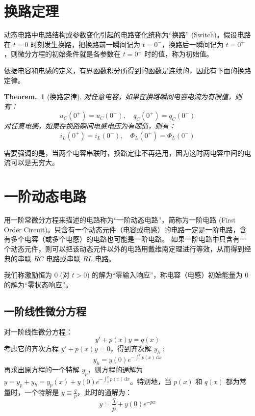 \documentclass[UTF8]{report}
\theoremstyle{MyLineTheoremStyle} %
\theoremstyle{MyBlockTheoremStyle} %
\newtheorem{BlockTheorem}[LineTheorem]{Theorem.\,} %
\theoremstyle{MySubsubsectionStyle} %
\begin{document}
\section{换路定理}
动态电路中电路结构或参数变化引起的电路变化统称为“换路” (Switch)。假设电路在 $t = 0$ 时刻发生换路，把换路前一瞬间记为 $t = 0^-$，换路后一瞬间记为 $t = 0^+$，则微分方程的初始条件就是各参数在 $t = 0^+$ 时的值，称为初始值。

依据电容和电感的定义，有界函数积分所得到的函数是连续的，因此有下面的换路定律。
\begin{BlockTheorem}[换路定律]\label{换路定律}
对任意电容，如果在换路瞬间电容电流为有限值，则有：
\begin{equation}
u_{C}(0^+) = u_{C}(0^-),\quad q_{C}(0^+) = q_{C}(0^-)
\end{equation}
对任意电感，如果在换路瞬间电感电压为有限值，则有：
\begin{equation}
i_{L}(0^+) = i_{L}(0^-),\quad \Phi_{L}(0^+) = \Phi_{L}(0^-)
\end{equation}
\end{BlockTheorem}

需要强调的是，当两个电容串联时，换路定律不再适用，因为这时两电容中间的电流可以是无穷大。

\section{一阶动态电路}

用一阶常微分方程来描述的电路称为“一阶动态电路”，简称为一阶电路 (First Order Circuit)。只含有一个动态元件（电容或电感）的电路一定是一阶电路，含有多个电容（或多个电感）的电路也可能是一阶电路。
如果一阶电路中只含有一个动态元件，则可以把该动态元件以外的电路用戴维南定理进行等效，从而得到经典的串联 $RC$ 电路或串联 $RL$ 电路。

我们称激励恒为 0 (对 $t>0$) 的解为“零输入响应”，称电容（电感）初始能量为 0 的解为“零状态响应”。


\subsection{一阶线性微分方程}

对一阶线性微分方程：
\begin{equation}
y' + p(x)y = q(x)
\end{equation}
考虑它的齐次方程 $y' + p(x)y = 0$，得到齐次解 $y_h$ : 
\begin{equation}
    y_h = y(0) e^{-\int_{0}^{x}p(x)\,\mathrm{d}x}
\end{equation}
再求出原方程的一个特解 $y_p$，则方程的通解为 $y = y_p + y_h = y_p(x) + y(0) e^{-\int_{0}^{x}p(x)\,\mathrm{d}x}$。特别地，当 $p(x)$ 和 $q(x)$ 都为常量时，一个特解是 $y \equiv \frac{q}{p}$，此时的通解为：
\begin{equation}
y = \frac{q}{p} + y(0)e^{-px}
\end{equation}
\end{document}
